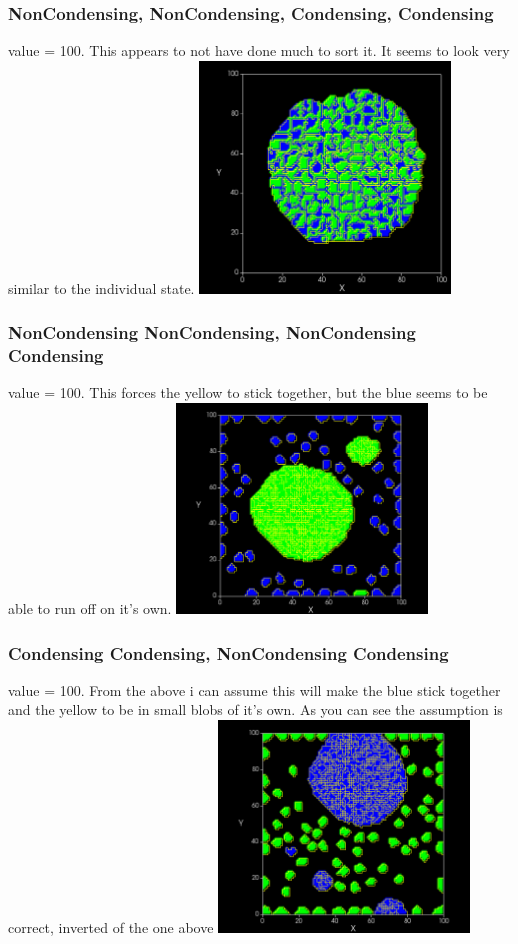 \documentclass{article}
\begin{document}
\subsubsection{NonCondensing, NonCondensing, Condensing, Condensing}
value = 100.  This appears to not have done much to sort it.  It seems to look very similar to the individual state.
    \includegraphics[width=0.5\textwidth]{nC_nC_c_c100}
    
\subsubsection{NonCondensing NonCondensing, NonCondensing Condensing}
value = 100.  This forces the yellow to stick together, but the blue seems to be able to run off on it's own.
    \includegraphics[width=0.5\textwidth]{nC_nC_nC_c100}
    
\subsubsection{Condensing Condensing, NonCondensing Condensing}
value = 100.  From the above i can assume this will make the blue stick together and the yellow to be in small blobs of it's own.  As you can see the assumption is correct, inverted of the one above
    \includegraphics[width=0.5\textwidth]{c_c_nC_c100}
\end{document}
